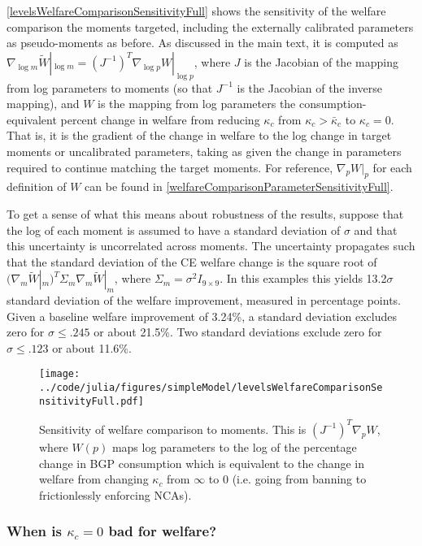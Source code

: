 \documentclass[ecta,nameyear,final]{econsocart}
\theoremstyle{definition}
\begin{document}
\autoref{levelsWelfareComparisonSensitivityFull} shows the sensitivity of the welfare comparison the moments targeted, including the externally calibrated parameters as pseudo-moments as before. As discussed in the main text, it is computed as $\nabla_{\log m} \tilde{W}|_{\log m} = (J^{-1})^T \nabla_{\log p} W|_{\log p}$, where $J$ is the Jacobian of the mapping from log parameters to moments (so that $J^{-1}$ is the Jacobian of the inverse mapping), and $W$ is the mapping from log parameters the consumption-equivalent percent change in welfare from reducing $\kappa_c$ from $\kappa_c > \bar{\kappa}_c$ to $\kappa_c = 0$. That is, it is the gradient of the change in welfare to the log change in target moments or uncalibrated parameters, taking as given the change in parameters required to continue matching the target moments. For reference, $\nabla_p W|_p$  for each definition of $W$ can be found in \autoref{welfareComparisonParameterSensitivityFull}.

To get a sense of what this means about robustness of the results, suppose that the log of each moment is assumed to have a standard deviation of $\sigma$ and that this uncertainty is uncorrelated across moments. The uncertainty propagates such that the standard deviation of the CE welfare change is the square root of $(\nabla_m \tilde{W}|_m)^T \Sigma_m \nabla_m \tilde{W}|_m$, where $\Sigma_m = \sigma^2 I_{9\times 9}$. In this examples this yields 13.2$\sigma$ standard deviation of the welfare improvement, measured in percentage points. Given a baseline welfare improvement of 3.24\%, a standard deviation excludes zero for $\sigma \le .245$ or about 21.5\%. Two standard deviations exclude zero for $\sigma \le .123$ or about 11.6\%. 

\begin{figure}[]
	\centering
	\texttt{[image: ../code/julia/figures/simpleModel/levelsWelfareComparisonSensitivityFull.pdf]}
	\caption{Sensitivity of welfare comparison to moments. This is $(J^{-1})^T \nabla_p W$, where $W(p)$ maps log parameters to the log of the percentage change in BGP consumption which is equivalent to the change in welfare from changing $\kappa_c$ from $\infty$ to $0$ (i.e. going from banning to frictionlessly enforcing NCAs).}
	\label{levelsWelfareComparisonSensitivityFull}
\end{figure}


\subsubsection{When is $\kappa_c = 0$ bad for welfare?}
\end{document}
